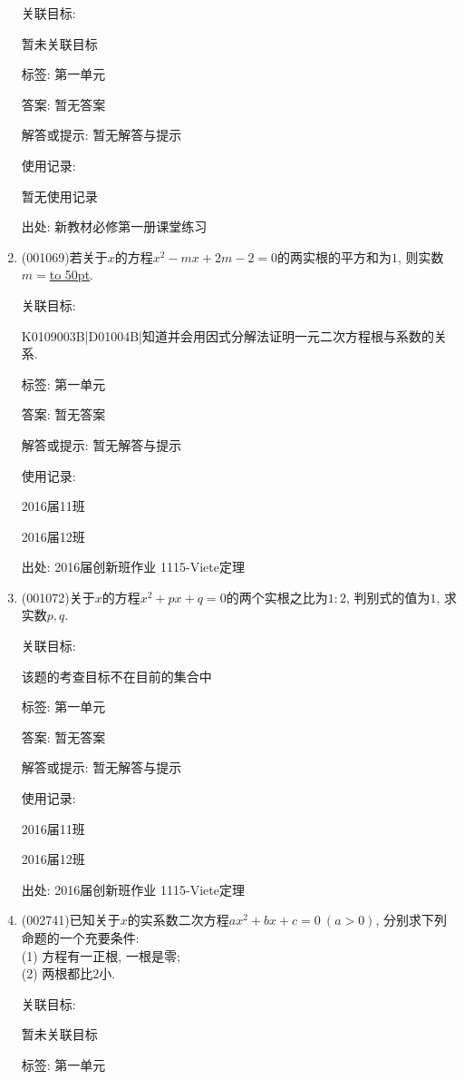 \documentclass[10pt,a4paper]{article}
\newcommand{\blank}[1]{\underline{\hbox to #1pt{}}}
\begin{document}
\begin{enumerate}[1.]
关联目标:

暂未关联目标



标签: 第一单元

答案: 暂无答案

解答或提示: 暂无解答与提示

使用记录:

暂无使用记录


出处: 新教材必修第一册课堂练习
\item { (001069)}若关于$x$的方程$x^2-mx+2m-2=0$的两实根的平方和为$1$, 则实数$m=$\blank{50}.


关联目标:

K0109003B|D01004B|知道并会用因式分解法证明一元二次方程根与系数的关系.



标签: 第一单元

答案: 暂无答案

解答或提示: 暂无解答与提示

使用记录:

2016届11班	

2016届12班	


出处: 2016届创新班作业	1115-Viete定理
\item { (001072)}关于$x$的方程$x^2+px+q=0$的两个实根之比为$1:2$, 判别式的值为$1$, 求实数$p,q$.


关联目标:

该题的考查目标不在目前的集合中



标签: 第一单元

答案: 暂无答案

解答或提示: 暂无解答与提示

使用记录:

2016届11班	

2016届12班	


出处: 2016届创新班作业	1115-Viete定理
\item { (002741)}已知关于$x$的实系数二次方程$a x^2 +bx+c=0\ (a>0)$, 分别求下列命题的一个充要条件:\\
(1) 方程有一正根, 一根是零;\\
(2) 两根都比$2$小.


关联目标:

暂未关联目标



标签: 第一单元


\end{enumerate}
\end{document}
